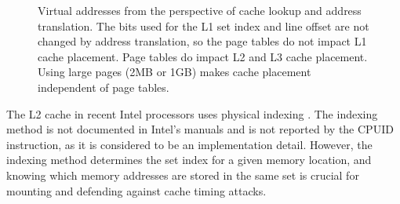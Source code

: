 \begin{figure}[hbt]
  \caption{
    Virtual addresses from the perspective of cache lookup and address
    translation. The bits used for the L1 set index and line offset are not
    changed by address translation, so the page tables do not impact L1 cache
    placement. Page tables do impact L2 and L3 cache placement. Using large
    pages (2MB or 1GB) makes cache placement independent of page tables.
  }
  \label{fig:caching_and_paging}
\end{figure}

The L2 cache in recent Intel processors uses physical indexing
\cite{patterson2013architecture}. The indexing method is not documented in
Intel's manuals and is not reported by the CPUID instruction, as it is
considered to be an implementation detail. However, the indexing method
determines the set index for a given memory location, and knowing which memory
addresses are stored in the same set is crucial for mounting and defending
against cache timing attacks.

